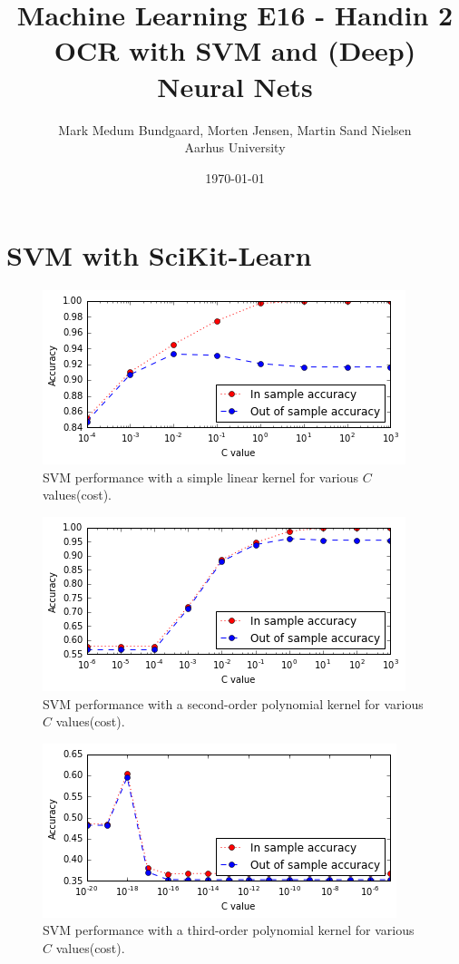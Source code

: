 \documentclass[a4paper,10pt,article,oneside,english]{memoir}
\begin{document}
	\title{Machine Learning E16 - Handin 2\\OCR with SVM and (Deep) Neural Nets}
	\author{Mark Medum Bundgaard, Morten Jensen, Martin Sand Nielsen\\ Aarhus University}
	\date{\today}
	
	\mainmatter
	\maketitle
	
	
\chapter{SVM with SciKit-Learn}


\begin{figure}[h!]
	\centering
	\includegraphics[width=0.7\linewidth]{svm_lin.PNG}
	\caption{SVM performance with a simple linear kernel for various $C$  values(cost).}
	\label{fig:svm_lin}
\end{figure}

\begin{figure}[h!]
	\centering
	\includegraphics[width=0.7\linewidth]{svm_poly2.PNG}
	\caption{SVM performance with a second-order polynomial kernel for various $C$ values(cost).}
	\label{fig:svm_poly2}
\end{figure}

\begin{figure}[h!]
	\centering
	\includegraphics[width=0.7\linewidth]{svm_poly3.PNG}
	\caption{SVM performance with a third-order polynomial kernel for various $C$ values(cost).}
	\label{fig:svm_poly3}
\end{figure}
\end{document}

